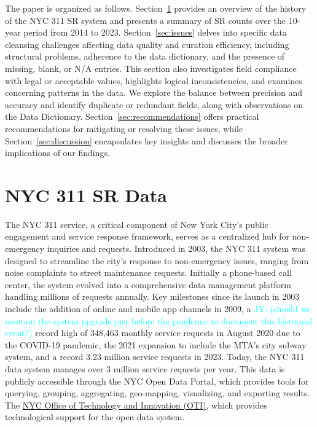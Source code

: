 \documentclass[linenumber]{jdsart}
\newcommand{\jy}[1]{\textcolor{cyan}{JY: (#1)}}
\begin{document}
The paper is organized as follows. Section~\ref{sec:data} provides 
an overview of the history of the NYC 311 SR system and presents 
a summary of SR counts over the 10-year period from 2014 to 2023. 
Section~\ref{sec:issues} delves into specific data cleansing 
challenges affecting data quality and curation efficiency, 
including structural problems, adherence to the data dictionary, 
and the presence of missing, blank, or N/A entries. This section 
also investigates field compliance with legal or acceptable values, 
highlights logical inconsistencies, and examines concerning patterns 
in the data. We explore the balance between precision and accuracy 
and identify duplicate or redundant fields, along with observations 
on the Data Dictionary. Section~\ref{sec:recommendations} offers 
practical recommendations for mitigating or resolving these issues, 
while Section~\ref{sec:discussion} encapsulates key insights and 
discusses the broader implications of our findings.


\section{NYC 311 SR Data} 
\label{sec:data}
The NYC 311 service, a critical component of New York City's public
engagement and service response framework, serves as a centralized hub
for non-emergency inquiries and requests. Introduced in 2003, the NYC
311 system was designed to streamline the city's response to
non-emergency issues, ranging from noise complaints to street
maintenance requests. Initially a phone-based call center, the system
evolved into a comprehensive data management platform handling
millions of requests annually. Key milestones since its launch in 2003
include the addition of online and mobile app channels in 2009, a
\jy{should we mention the system upgrade just before the pandemic to
  document this historical event?}
record high of 348,463 monthly service requests in August 2020 due to
the COVID-19 pandemic, the 2021 expansion to include the MTA's city
subway system, and a record 3.23 million service requests in
2023. Today, the NYC 311 data system manages over 3 million service
requests per year. This data is publicly accessible through the NYC Open Data
Portal, which provides tools for querying, grouping, aggregating,
geo-mapping, visualizing, and exporting results. The
\href{https://www.nyc.gov/content/oti/pages/}{NYC Office of Technology
  and Innovation (OTI)}, which provides technological support for the
open data system. 
\end{document}
